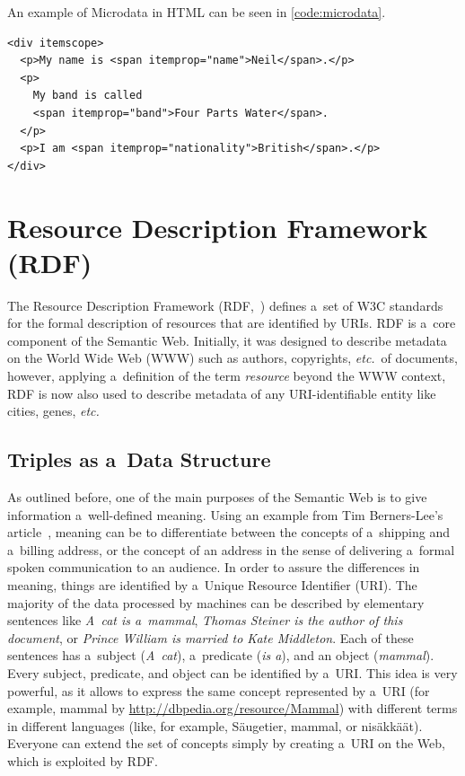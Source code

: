 An example of Microdata in HTML can be seen in \autoref{code:microdata}.

\begin{lstlisting}[caption={
  [Sample code snippet with Microdata mark-up]
  {Sample code snippet with Microdata mark-up
   (\url{http://www.w3.org/TR/microdata/})}},
  label={code:microdata}]
<div itemscope>
  <p>My name is <span itemprop="name">Neil</span>.</p>
  <p>
    My band is called
    <span itemprop="band">Four Parts Water</span>.
  </p>
  <p>I am <span itemprop="nationality">British</span>.</p>
</div>
\end{lstlisting}

\section{Resource Description Framework (RDF)} \label{sec:rdf}

The Resource Description Framework (RDF,~\cite{klyne2004rdf})
defines a~set of W3C standards for the formal description of
resources that are identified by URIs.
RDF is a~core component of the Semantic Web.
Initially, it was designed to describe metadata
on the World Wide Web (WWW) such as authors,
copyrights, \emph{etc.}\ of documents, however,
applying a~definition of the term \emph{resource}
beyond the WWW context,
RDF is now also used to describe metadata
of any URI-identifiable entity like cities, genes, \emph{etc.}

\subsection{Triples as a~Data Structure}

As outlined before, one of the main purposes of the Semantic Web
is to give information a~well-defined meaning.
Using an example from Tim Berners-Lee’s
article~\cite{bernerslee2001semanticweb},
meaning can be to differentiate between the concepts of
a~shipping and a~billing address,
or the concept of an address in the sense of
delivering a~formal spoken communication to an audience.
In order to assure the differences in meaning,
things are identified by a~Unique Resource Identifier (URI).
The majority of the data processed by machines
can be described by elementary sentences like
\emph{A~cat is a~mammal},
\emph{Thomas Steiner is the author of this document},
or \emph{Prince William is married to Kate Middleton}.
Each of these sentences has a~subject (\emph{A~cat}),
a~predicate (\emph{is a}), and an object (\emph{mammal}).
Every subject, predicate, and object can be identified by a~URI.
This idea is very powerful,
as it allows to express the same concept
represented by a~URI (for example, mammal by
\url{http://dbpedia.org/resource/Mammal})
with different terms in different languages
(like, for example, Säugetier, mammal, or nisäkkäät).
Everyone can extend the set of concepts
simply by creating a~URI on the Web,
which is exploited by RDF.

